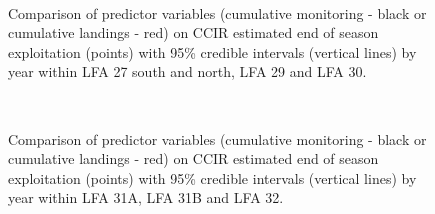 \documentclass[11pt]{article}
\newcommand{\D}{.}
\newcommand{\e}{/backup/bio_data/bio.lobster/figures/} %
\begin{document}
\begin{figure}
        \centering
         \\
                 \caption{Comparison of predictor variables (cumulative monitoring - black or cumulative landings - red) on CCIR estimated end of season exploitation (points) with 95\% credible intervals (vertical lines) by year within LFA 27 south and north, LFA 29 and LFA 30.}
        \end{figure}

 \begin{figure}
        \centering
        \\
               \caption{Comparison of predictor variables (cumulative monitoring - black or cumulative landings - red) on CCIR estimated end of season exploitation (points) with 95\% credible intervals (vertical lines) by year within LFA 31A, LFA 31B and LFA 32.}
    \end{figure}
\end{document}

